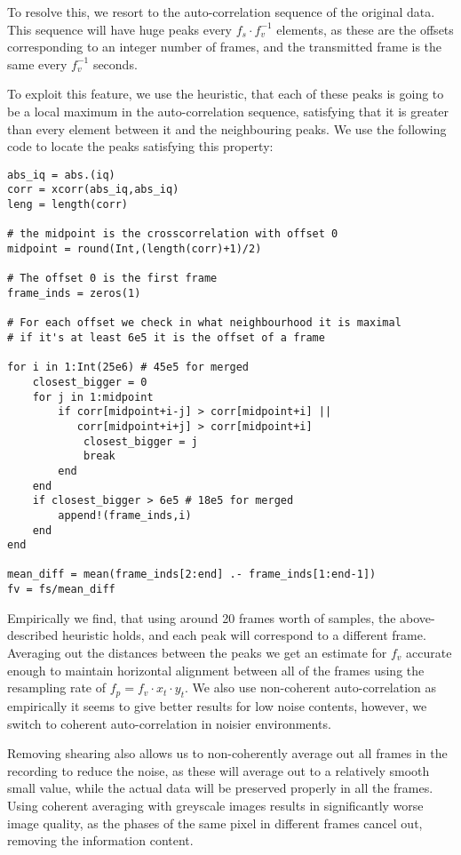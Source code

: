 \documentclass{article}
\begin{document}
To resolve this, we resort to the auto-correlation sequence of the original data. This sequence will have huge peaks every $f_s \cdot f_v^{-1}$ elements, as these are the offsets corresponding to an integer number of frames, and the transmitted frame is the same every $f_v^{-1}$ seconds. 

To exploit this feature, we use the heuristic, that each of these peaks is going to be a local maximum in the auto-correlation sequence, satisfying that it is greater than every element between it and the neighbouring peaks. We use the following code to locate the peaks satisfying this property:

\begin{center}
\begin{verbatim}
abs_iq = abs.(iq)
corr = xcorr(abs_iq,abs_iq)
leng = length(corr)

# the midpoint is the crosscorrelation with offset 0
midpoint = round(Int,(length(corr)+1)/2)

# The offset 0 is the first frame
frame_inds = zeros(1)	

# For each offset we check in what neighbourhood it is maximal
# if it's at least 6e5 it is the offset of a frame

for i in 1:Int(25e6) # 45e5 for merged
    closest_bigger = 0
    for j in 1:midpoint
        if corr[midpoint+i-j] > corr[midpoint+i] || 
           corr[midpoint+i+j] > corr[midpoint+i]
            closest_bigger = j
            break
        end
    end
    if closest_bigger > 6e5 # 18e5 for merged
        append!(frame_inds,i)
    end
end

mean_diff = mean(frame_inds[2:end] .- frame_inds[1:end-1])
fv = fs/mean_diff
\end{verbatim}
\end{center}

Empirically we find, that using around 20 frames worth of samples, the above-described heuristic holds, and each peak will correspond to a different frame. Averaging out the distances between the peaks we get an estimate for $f_v$ accurate enough to maintain horizontal alignment between all of the frames using the resampling rate of $f_p = f_v \cdot x_t \cdot y_t$. We also use non-coherent auto-correlation as empirically it seems to give better results for low noise contents, however, we switch to coherent auto-correlation in noisier environments.

Removing shearing also allows us to non-coherently average out all frames in the recording to reduce the noise, as these will average out to a relatively smooth small value, while the actual data will be preserved properly in all the frames. Using coherent averaging with greyscale images results in significantly worse image quality, as the phases of the same pixel in different frames cancel out, removing the information content.
\end{document}
